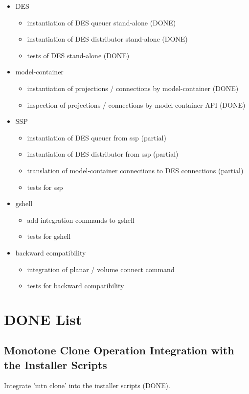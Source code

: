 \documentclass[12pt]{article}
\begin{document}
\begin{itemize}
\item DES
  \begin{itemize}
  \item instantiation of DES queuer stand-alone (DONE)
  \item instantiation of DES distributor stand-alone (DONE)
  \item tests of DES stand-alone (DONE)
  \end{itemize}
\item model-container
  \begin{itemize}
  \item instantiation of projections / connections by model-container (DONE)
  \item inspection of projections / connections by model-container API (DONE)
  \end{itemize}
\item SSP
  \begin{itemize}
  \item instantiation of DES queuer from ssp (partial)
  \item instantiation of DES distributor from ssp (partial)
  \item translation of model-container connections to DES connections (partial)
  \item tests for ssp
  \end{itemize}
\item gshell
  \begin{itemize}
  \item add integration commands to gshell
  \item tests for gshell
  \end{itemize}
\item backward compatibility
  \begin{itemize}
  \item integration of planar / volume connect command
  \item tests for backward compatibility
  \end{itemize}
\end{itemize}


\section{DONE List}

\subsection{Monotone Clone Operation Integration with the Installer Scripts}
Integrate 'mtn clone' into the installer scripts (DONE).
\end{document}

